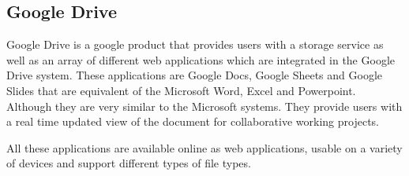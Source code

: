 \subsection{Google Drive}
Google Drive is a google product that provides users with a storage service as well as an array of different web applications which are integrated in the Google Drive system. 
These applications are Google Docs, Google Sheets and Google Slides that are equivalent of the Microsoft Word, Excel and Powerpoint. 
Although they are very similar to the Microsoft systems.
They provide users with a real time updated view of the document for collaborative working projects.

All these applications are available online as web applications, usable on a variety of devices and support different types of file types.\cite{GoogleDriveContents}